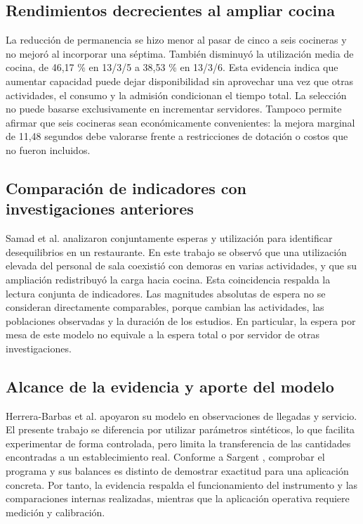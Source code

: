 \documentclass[10pt,a4paper,twocolumn]{article}
\begin{document}
\subsection{Rendimientos decrecientes al ampliar cocina}

La reducción de permanencia se hizo menor al pasar de cinco a seis cocineras y no mejoró al incorporar una séptima. También disminuyó la utilización media de cocina, de 46,17 \% en 13/3/5 a 38,53 \% en 13/3/6. Esta evidencia indica que aumentar capacidad puede dejar disponibilidad sin aprovechar una vez que otras actividades, el consumo y la admisión condicionan el tiempo total. La selección no puede basarse exclusivamente en incrementar servidores. Tampoco permite afirmar que seis cocineras sean económicamente convenientes: la mejora marginal de 11,48 segundos debe valorarse frente a restricciones de dotación o costos que no fueron incluidos.

\subsection{Comparación de indicadores con investigaciones anteriores}

Samad et al. \cite{ref9} analizaron conjuntamente esperas y utilización para identificar desequilibrios en un restaurante. En este trabajo se observó que una utilización elevada del personal de sala coexistió con demoras en varias actividades, y que su ampliación redistribuyó la carga hacia cocina. Esta coincidencia respalda la lectura conjunta de indicadores. Las magnitudes absolutas de espera no se consideran directamente comparables, porque cambian las actividades, las poblaciones observadas y la duración de los estudios. En particular, la espera por mesa de este modelo no equivale a la espera total o por servidor de otras investigaciones.

\subsection{Alcance de la evidencia y aporte del modelo}

Herrera-Barbas et al. \cite{ref10} apoyaron su modelo en observaciones de llegadas y servicio. El presente trabajo se diferencia por utilizar parámetros sintéticos, lo que facilita experimentar de forma controlada, pero limita la transferencia de las cantidades encontradas a un establecimiento real. Conforme a Sargent \cite{ref3}, comprobar el programa y sus balances es distinto de demostrar exactitud para una aplicación concreta. Por tanto, la evidencia respalda el funcionamiento del instrumento y las comparaciones internas realizadas, mientras que la aplicación operativa requiere medición y calibración.
\end{document}
